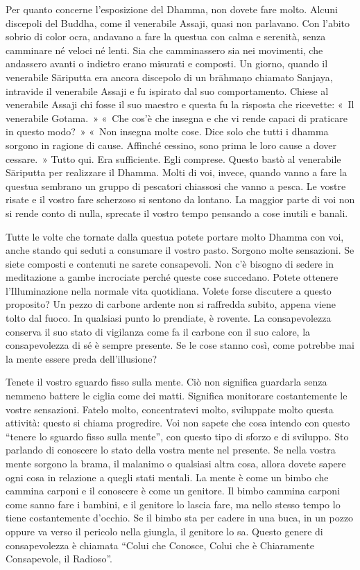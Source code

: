 Per quanto concerne l'esposizione del Dhamma, non dovete fare molto.
Alcuni discepoli del Buddha, come il venerabile Assaji, quasi non
parlavano. Con l'abito sobrio di color ocra, andavano a fare la questua
con calma e serenità, senza camminare né veloci né lenti. Sia che
camminassero sia nei movimenti, che andassero avanti o indietro erano
misurati e composti. Un giorno, quando il venerabile Sāriputta era
ancora discepolo di un brāhmaṇo chiamato Sanjaya, intravide il
venerabile Assaji e fu ispirato dal suo comportamento. Chiese al
venerabile Assaji chi fosse il suo maestro e questa fu la risposta che
ricevette: «~Il venerabile Gotama.~» «~Che cos'è che insegna e che vi
rende capaci di praticare in questo modo?~» «~Non insegna molte cose.
Dice solo che tutti i dhamma sorgono in ragione di cause.
Affinché cessino, sono prima le loro cause a dover cessare.~» Tutto qui.
Era sufficiente. Egli comprese. Questo bastò al venerabile Sāriputta per
realizzare il Dhamma. Molti di voi, invece, quando vanno a fare la
questua sembrano un gruppo di pescatori chiassosi che vanno a pesca. Le
vostre risate e il vostro fare scherzoso si sentono da lontano. La
maggior parte di voi non si rende conto di nulla, sprecate il vostro
tempo pensando a cose inutili e banali.

Tutte le volte che tornate dalla questua potete portare molto Dhamma con
voi, anche stando qui seduti a consumare il vostro pasto. Sorgono molte
sensazioni. Se siete composti e contenuti ne sarete consapevoli. Non c'è
bisogno di sedere in meditazione a gambe incrociate perché queste cose
succedano. Potete ottenere l'Illuminazione nella normale vita
quotidiana. Volete forse discutere a questo proposito? Un pezzo di
carbone ardente non si raffredda subito, appena viene tolto dal fuoco.
In qualsiasi punto lo prendiate, è rovente. La consapevolezza conserva
il suo stato di vigilanza come fa il carbone con il suo calore, la
consapevolezza di sé è sempre presente. Se le cose stanno così, come
potrebbe mai la mente essere preda dell'illusione?

Tenete il vostro sguardo fisso sulla mente. Ciò non significa guardarla
senza nemmeno battere le ciglia come dei matti. Significa monitorare
costantemente le vostre sensazioni. Fatelo molto, concentratevi molto,
sviluppate molto questa attività: questo si chiama progredire. Voi non
sapete che cosa intendo con questo ``tenere lo sguardo fisso sulla
mente'', con questo tipo di sforzo e di sviluppo. Sto parlando di
conoscere lo stato della vostra mente nel presente. Se nella vostra
mente sorgono la brama, il malanimo o qualsiasi altra cosa, allora
dovete sapere ogni cosa in relazione a quegli stati mentali. La mente è
come un bimbo che cammina carponi e il conoscere è come un genitore. Il
bimbo cammina carponi come sanno fare i bambini, e il genitore lo lascia
fare, ma nello stesso tempo lo tiene costantemente d'occhio. Se il bimbo
sta per cadere in una buca, in un pozzo oppure va verso il pericolo
nella giungla, il genitore lo sa. Questo genere di consapevolezza è
chiamata ``Colui che Conosce, Colui che è Chiaramente Consapevole, il
Radioso''.

